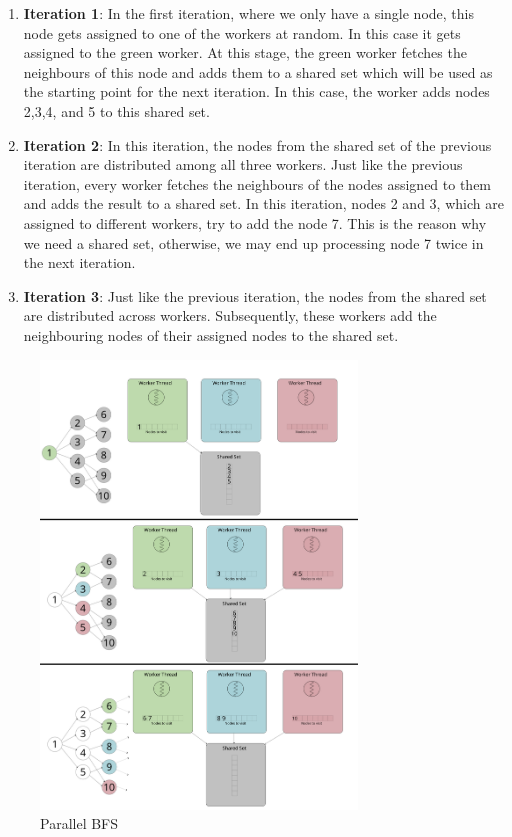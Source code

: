 \begin{enumerate}
    \item \textbf{Iteration 1}: In the first iteration, where we only have a
        single node, this node gets assigned to one of the workers at
        random. In this case it gets assigned to the green worker. At this
        stage, the green worker fetches the neighbours of this node and adds
        them to a shared set which will be used as the starting point for the
        next iteration. In this case, the worker adds nodes 2,3,4, and 5 to this
        shared set.
    \item \textbf{Iteration 2}: In this iteration, the nodes from the shared set
        of the previous iteration are distributed among all three workers. Just
        like the previous iteration, every worker fetches the neighbours of the
        nodes assigned to them and adds the result to a shared set. In this
        iteration, nodes 2 and 3, which are assigned to different workers, try
        to add the node 7. This is the reason why we need a shared set,
        otherwise, we may end up processing node 7 twice in the next iteration.
    \item \textbf{Iteration 3}: Just like the previous iteration, the nodes from
        the shared set are distributed across workers. Subsequently, these
        workers add the neighbouring nodes of their assigned nodes to the shared
        set.
\end{enumerate}
\begin{figure}[ht]
    \centering
    \includegraphics[width=0.75\textwidth]{figures/parallelBFS.png}
    \caption{Parallel BFS}
    \label{fig:parallelBFS}
\end{figure}


